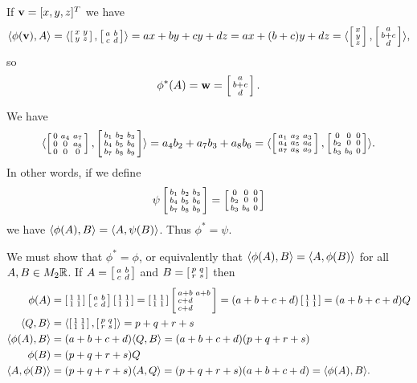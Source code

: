  If $\vv=[x,y,z]^T$ we have
 \[ \ip{\phi(\vv),A} =
    \ip{\bsm x&y\\ y&z\esm,\bsm a&b\\ c&d\esm} =
    ax+by+cy+dz = ax + (b+c)y + dz =
    \ip{\bsm x\\ y\\ z\esm, \bsm a\\ b+c\\ d\esm},
 \]
 so
 \[ \phi^*(A) = \vw = \bsm a\\ b+c\\ d\esm. \]
\EndDeferredSolution

 We have
 \[ \ip{\bsm 0 & a_4 & a_7 \\ 0 & 0 & a_8 \\ 0 & 0 & 0 \esm,
        \bsm b_1 & b_2 & b_3 \\ b_4 & b_5 & b_6 \\ b_7 & b_8 & b_9 \esm}
    = a_4b_2 + a_7 b_3 + a_8b_6 =
  \ip{\bsm a_1 & a_2 & a_3 \\ a_4 & a_5 & a_6 \\ a_7 & a_8 & a_9 \esm,
      \bsm 0 & 0 & 0 \\ b_2 & 0 & 0 \\ b_3 & b_6 & 0 \esm}.
 \]
 In other words, if we define
 \[ \psi\bsm b_1 & b_2 & b_3 \\
             b_4 & b_5 & b_6 \\
             b_7 & b_8 & b_9 \esm =
      \bsm 0 & 0 & 0 \\ b_2 & 0 & 0 \\ b_3 & b_6 & 0 \esm
 \]
 we have $\ip{\phi(A),B}=\ip{A,\psi(B)}$.  Thus $\phi^*=\psi$.
\EndDeferredSolution

 We must show that $\phi^*=\phi$, or equivalently that
 $\ip{\phi(A),B}=\ip{A,\phi(B)}$ for all $A,B\in M_2\R$.
 If $A=\bsm a&b\\ c&d\esm$ and $B=\bsm p&q\\ r&s\esm$ then
 \begin{align*}
  \phi(A) &=
   \bsm 1&1\\ 1&1\esm \bsm a&b\\ c&d\esm\bsm 1&1\\ 1&1\esm
   = \bsm 1&1\\ 1&1\esm \bsm a+b&a+b \\ c+d\\ c+d\esm
   = (a+b+c+d) \bsm 1&1\\ 1&1\esm = (a+b+c+d)Q \\
  \ip{Q,B} &= \ip{\bsm 1&1\\ 1&1\esm,\bsm p&q\\ r&s\esm}
            = p+q+r+s \\
  \ip{\phi(A),B} &=
    (a+b+c+d)\ip{Q,B} = (a+b+c+d)(p+q+r+s) \\
  \phi(B) &= (p+q+r+s) Q \\
  \ip{A,\phi(B)} &= (p+q+r+s) \ip{A,Q} = (p+q+r+s)(a+b+c+d)
    = \ip{\phi(A),B}.
 \end{align*}
\EndDeferredSolution

